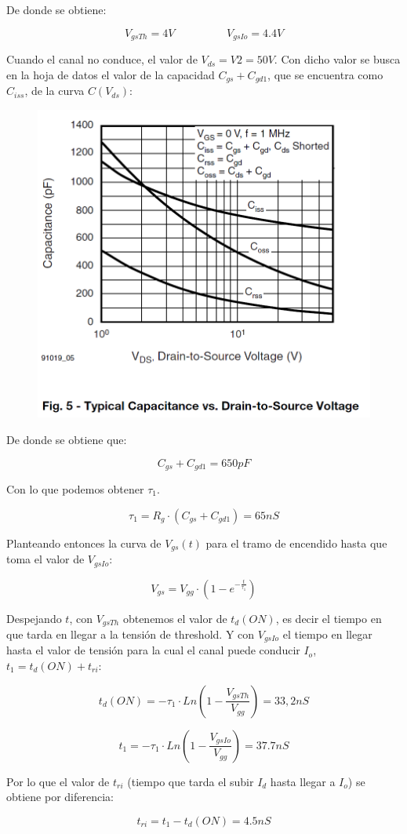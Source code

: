 \documentclass[e4_tp1_main.tex]{subfiles}
\begin{document}
De donde se obtiene:

\[
V_{gsTh} = 4V \hspace{2cm} V_{gsIo} = 4.4V
\]

Cuando el canal no conduce, el valor de $V_{ds} = V2 = 50V$. Con dicho valor se busca en la hoja de datos el valor de la capacidad $C_{gs} + C_{gd1}$, que se encuentra como $C_{iss}$, de la curva $C(V_{ds})$:

\begin{figure}[H]
\centering
\includegraphics[width=0.5\linewidth]{Images/Ej1-Capacidades.png}
\end{figure}

De donde se obtiene que:

\[
C_{gs} + C_{gd1} = 650pF
\]

Con lo que podemos obtener $\tau_1$.

\[
\tau_1 = R_g \cdot (C_{gs} + C_{gd1}) = 65nS
\]

Planteando entonces la curva de $V_{gs}(t)$ para el tramo de encendido hasta que toma el valor de $V_{gsIo}$:

\[
V_{gs} = V_{gg} \cdot (1 - e^{-\frac{t}{\tau_1}})
\]

Despejando $t$, con $V_{gsTh}$ obtenemos el valor de $t_d(ON)$, es decir el tiempo en que tarda en llegar a la tensión de threshold. Y con $V_{gsIo}$ el tiempo en llegar hasta el valor de tensión para la cual el canal puede conducir $I_o$, $t_1 = t_d(ON) + t_{ri}$:

\[
t_d(ON) = -\tau_1 \cdot Ln\left( 1 - \frac{V_{gsTh}}{V_{gg}} \right) = 33,2nS
\]

\[
t_1 = -\tau_1 \cdot Ln\left( 1 - \frac{V_{gsIo}}{V_{gg}} \right) = 37.7nS
\]

Por lo que el valor de $t_{ri}$ (tiempo que tarda el subir $I_d$ hasta llegar a $I_o$) se obtiene por diferencia:

\[
t_{ri} = t_1 - t_d(ON)= 4.5nS
\]
\end{document}
